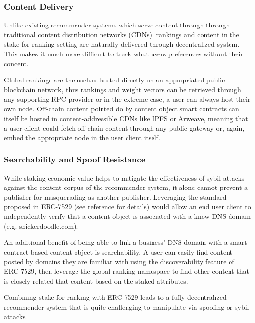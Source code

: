 \subsubsection{Content Delivery}

Unlike existing recommender systems which serve content through through traditional content distribution networks (CDNs), rankings and content in the stake for ranking setting are naturally delivered through decentralized system. This makes it much more difficult to track what users preferences without their concent. 

Global rankings are themselves hosted directly on an appropriated public blockchain network, thus rankings and weight vectors can be retrieved through any supporting RPC provider or in the extreme case, a user can always host their own node. Off-chain content pointed do by content object smart contracts can itself be hosted in content-addressible CDNs like IPFS or Arweave, meaning that a user client could fetch off-chain content through any public gateway or, again, embed the appropriate node in the user client itself. 

\subsubsection{Searchability and Spoof Resistance}

While staking economic value helps to mitigate the effectiveness of sybil attacks against the content corpus of the recommender system, it alone cannot prevent a publisher for masquerading as another publisher. Leveraging the standard proposed in ERC-7529 (see reference \cite{chapman2023erc7529} for details) would allow an end user client to independently verify that a content object is associated with a know DNS domain (e.g. snickerdoodle.com). 

An additional benefit of being able to link a business' DNS domain with a smart contract-based content object is searchability. A user can easily find content posted by domains they are familiar with using the discoverability feature of ERC-7529, then leverage the global ranking namespace to find other content that is closely related that content based on the staked attributes. 

Combining stake for ranking with ERC-7529 leads to a fully decentralized recommender system that is quite challenging to manipulate via spoofing or sybil attacks. 